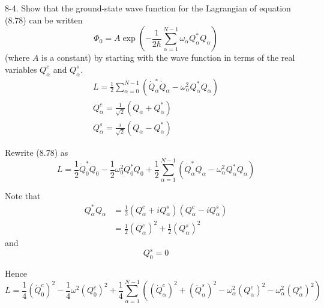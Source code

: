 \documentclass[12pt]{article}
\begin{document}
8-4.
Show that the ground-state wave function for the Lagrangian of
equation (8.78) can be written
\begin{equation*}
\Phi_0=A\exp\left(
-\frac{1}{2\hbar}
\sum_{\alpha=1}^{N-1}
\omega_\alpha Q_\alpha^*Q_\alpha
\right)
\tag{8.83}
\end{equation*}
(where $A$ is a constant) by starting with the wave function in terms of
the real variables $Q_\alpha^c$ and $Q_\alpha^s$.
\begin{gather*}
L=\frac{1}{2}\sum_{\alpha=0}^{N-1}
\left(\dot Q_\alpha^*\dot Q_\alpha-\omega_\alpha^2Q_\alpha^*Q_\alpha\right)
\tag{8.78}
\\
Q_\alpha^c=\frac{1}{\sqrt2}(Q_\alpha+Q_\alpha^*)
\tag{8.79}
\\
Q_\alpha^s=\frac{i}{\sqrt2}(Q_\alpha-Q_\alpha^*)
\tag{8.80}
\end{gather*}

Rewrite (8.78) as
\begin{equation*}
L=\frac{1}{2}\dot Q_0^*\dot Q_0
-\frac{1}{2}\omega_0^2Q_0^*Q_0
+\frac{1}{2}\sum_{\alpha=1}^{N-1}
\left(\dot Q_\alpha^*\dot Q_\alpha-\omega_\alpha^2Q_\alpha^*Q_\alpha\right)
\end{equation*}

Note that
\begin{align*}
Q_\alpha^*Q_\alpha
&=\frac{1}{2}(Q_\alpha^c+iQ_\alpha^s)(Q_\alpha^c-iQ_\alpha^s)
\\
&=\frac{1}{2}(Q_\alpha^c)^2+\frac{1}{2}(Q_\alpha^s)^2
\end{align*}
and
\begin{equation*}
Q_0^s=0
\end{equation*}

Hence
\begin{equation*}
L=\frac{1}{4}(\dot Q_0^c)^2-\frac{1}{4}\omega^2(Q_0^c)^2
+\frac{1}{4}\sum_{\alpha=1}^{N-1}
\left(
(\dot Q_\alpha^c)^2
+(\dot Q_\alpha^s)^2
-\omega_\alpha^2(Q_\alpha^c)^2
-\omega_\alpha^2(Q_\alpha^s)^2
\right)
\end{equation*}

\end{document}
